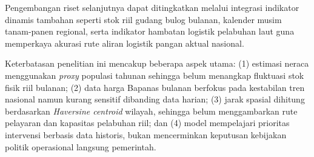 \documentclass[journal, a4paper]{IEEEtran}
\begin{document}
Pengembangan riset selanjutnya dapat ditingkatkan melalui integrasi indikator dinamis tambahan seperti stok riil gudang bulog bulanan, kalender musim tanam-panen regional, serta indikator hambatan logistik pelabuhan laut guna memperkaya akurasi rute aliran logistik pangan aktual nasional.

Keterbatasan penelitian ini mencakup beberapa aspek utama: (1) estimasi neraca menggunakan \textit{proxy} populasi tahunan sehingga belum menangkap fluktuasi stok fisik riil bulanan; (2) data harga Bapanas bulanan berfokus pada kestabilan tren nasional namun kurang sensitif dibanding data harian; (3) jarak spasial dihitung berdasarkan \textit{Haversine centroid} wilayah, sehingga belum menggambarkan rute pelayaran dan kapasitas pelabuhan riil; dan (4) model mempelajari prioritas intervensi berbasis data historis, bukan mencerminkan keputusan kebijakan politik operasional langsung pemerintah.
\end{document}
